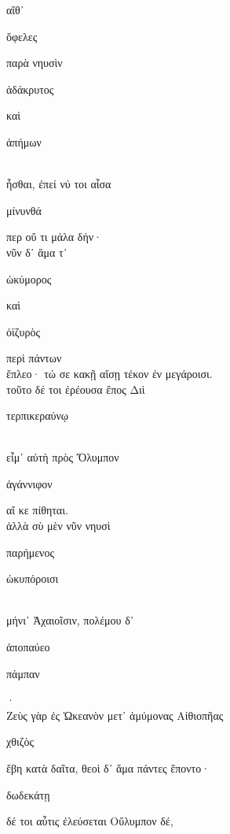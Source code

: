 \documentclass{ransom}
\begin{document}
\renewcommand{\rightheaderwhat}{\rightheaderwhatglosses}%
\begin{foreignpage}
\begin{graytext}
αἴθ᾽ \begin{whitetext}ὄφελες\end{whitetext} παρὰ νηυσὶν \begin{whitetext}ἀδάκρυτος\end{whitetext} καὶ \begin{whitetext}ἀπήμων\end{whitetext}\hfill{}\\
ἧσθαι, ἐπεί νύ τοι αἶσα \begin{whitetext}μίνυνθά\end{whitetext} περ οὔ τι μάλα δήν·\\
νῦν δ᾽ ἅμα τ᾽ \begin{whitetext}ὠκύμορος\end{whitetext} καὶ \begin{whitetext}ὀϊζυρὸς\end{whitetext} περὶ πάντων\\
ἔπλεο· τώ σε κακῇ αἴσῃ τέκον ἐν μεγάροισι.\\
τοῦτο δέ τοι ἐρέουσα ἔπος Διὶ \begin{whitetext}τερπικεραύνῳ\end{whitetext}\\
εἶμ᾽ αὐτὴ πρὸς Ὄλυμπον \begin{whitetext}ἀγάννιφον\end{whitetext} αἴ κε πίθηται.\hfill{}\\
ἀλλὰ σὺ μὲν νῦν νηυσὶ \begin{whitetext}παρήμενος\end{whitetext} \begin{whitetext}ὠκυπόροισι\end{whitetext}\\
μήνι᾽ Ἀχαιοῖσιν, πολέμου δ᾽ \begin{whitetext}ἀποπαύεο\end{whitetext} \begin{whitetext}πάμπαν\end{whitetext}·\\
Ζεὺς γὰρ ἐς Ὠκεανὸν μετ᾽ ἀμύμονας Αἰθιοπῆας\\
\begin{whitetext}χθιζὸς\end{whitetext} ἔβη κατὰ δαῖτα, θεοὶ δ᾽ ἅμα πάντες ἕποντο·\\
\begin{whitetext}δωδεκάτῃ\end{whitetext} δέ τοι αὖτις ἐλεύσεται Οὔλυμπον δέ,\hfill{}\\

\end{graytext}
\end{foreignpage}
\end{document}
